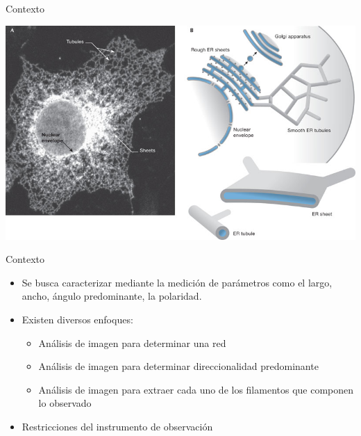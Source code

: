 \documentclass[10pt]{beamer}
\begin{document}
\begin{frame}[fragile]{Contexto}

\begin{center}
    \includegraphics[width=\textwidth]{F1-large.jpg}
        \end{center}
\end{frame}


\begin{frame}[fragile]{Contexto}
\begin{itemize}
    \item Se busca caracterizar mediante la medici\'on de par\'ametros como el largo, ancho, \'angulo predominante, la polaridad.
    \item Existen diversos enfoques:
    \begin{itemize}
        \item An\'alisis de imagen para determinar una red
        \item An\'alisis de imagen para determinar direccionalidad predominante
        \item An\'alisis de imagen para extraer cada uno de los filamentos que componen lo observado
    \end{itemize}
    \item Restricciones del instrumento de observaci\'on
\end{itemize}
\end{frame}
\end{document}
